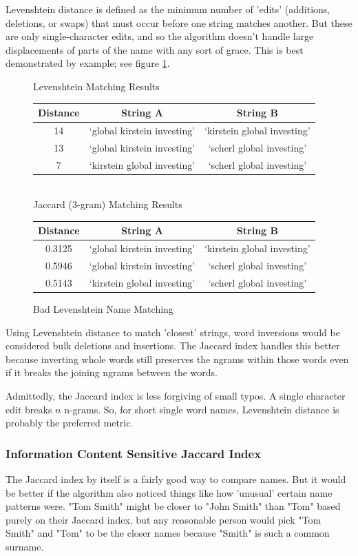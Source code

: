 \documentclass[11pt]{article}
\begin{document}
Levenshtein distance is defined as \cite{levenshtein} the minimum number of 'edits' 
(additions, deletions, or swaps) that must occur before one string matches another.
But these are only single-character edits, and so the algorithm doesn't handle large displacements
of parts of the name with any sort of grace.
This is best demonstrated by example; see figure \ref{fig:lev_comp}.

\begin{figure}[h!]
\centering
Levenshtein Matching Results\\
\begin{tabular}{c|c|c}
  Distance & String A & String B \\
\hline
  14 & `global kirstein investing' & `kirstein global investing' \\
  13 & `global kirstein investing' & `scherl global investing' \\
  7 & `kirstein global investing' & `scherl global investing'
\end{tabular}
\\
Jaccard (3-gram) Matching Results\\
\begin{tabular}{c|c|c}
  Distance & String A & String B \\
\hline
  0.3125 & `global kirstein investing' & `kirstein global investing' \\
  0.5946 & `global kirstein investing' & `scherl global investing' \\
  0.5143 & `kirstein global investing' & `scherl global investing'
\end{tabular}
\caption{Bad Levenshtein Name Matching}
\label{fig:lev_comp}
\end{figure}

Using Levenshtein distance to match 'closest' strings, word 
inversions would be considered bulk deletions and insertions. 
The Jaccard index handles this better because inverting whole words 
still preserves the ngrams within those words even if it breaks
the joining ngrams between the words.

Admittedly, the Jaccard index is less forgiving of small typos. 
A single character edit breaks $n$ n-grams. So, for short single
word names, Levenshtein distance is probably the preferred metric.

\subsubsection{Information Content Sensitive Jaccard Index}
The Jaccard index by itself is a fairly good way to compare names.
But it would be better if the algorithm also noticed things like
how 'unusual' certain name patterns were. 
"Tom Smith" might be closer to "John Smith" than "Tom" based purely
on their Jaccard index, but any reasonable person would pick
"Tom Smith" and "Tom" to be the closer names because "Smith" is
such a common surname.
\end{document}
